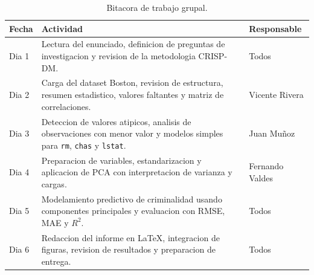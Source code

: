\documentclass[10pt,a4paper]{article}
\begin{document}
\begin{table}[H]
  \centering
  \footnotesize
  \caption{Bitacora de trabajo grupal.}
  \label{tab:bitacora}
  \begin{tabularx}{\textwidth}{l X l}
    \toprule
    \textbf{Fecha} & \textbf{Actividad} & \textbf{Responsable} \\
    \midrule
    Dia 1 & Lectura del enunciado, definicion de preguntas de investigacion y revision de la metodologia CRISP-DM. & Todos \\
    Dia 2 & Carga del dataset Boston, revision de estructura, resumen estadistico, valores faltantes y matriz de correlaciones. & Vicente Rivera \\
    Dia 3 & Deteccion de valores atipicos, analisis de observaciones con menor valor y modelos simples para \texttt{rm}, \texttt{chas} y \texttt{lstat}. & Juan Mu\~noz \\
    Dia 4 & Preparacion de variables, estandarizacion y aplicacion de PCA con interpretacion de varianza y cargas. & Fernando Valdes \\
    Dia 5 & Modelamiento predictivo de criminalidad usando componentes principales y evaluacion con RMSE, MAE y $R^2$. & Todos \\
    Dia 6 & Redaccion del informe en LaTeX, integracion de figuras, revision de resultados y preparacion de entrega. & Todos \\
    \bottomrule
  \end{tabularx}
\end{table}
\end{document}
